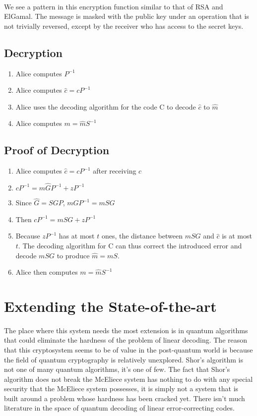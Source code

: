 \documentclass{article}
\theoremstyle{definition}
\begin{document}
	\paragraph{} We see a pattern in this encryption function similar to that of RSA and ElGamal.  The message is masked with the public key under an operation that is not trivially reversed, except by the receiver who has access to the secret keys.
	
	\subsection{Decryption}
	\begin{enumerate}[1)]
	\item Alice computes $P^{-1}$
	\item Alice computes ${\hat c} = cP^{-1}$
	\item Alice uses the decoding algorithm for the code C to decode ${\hat c}$ to ${\hat m}$
	\item Alice computes $m = {\hat m}S^{-1}$
	\end{enumerate}

	\subsection{Proof of Decryption}
	\begin{enumerate}
	\item Alice computes ${\hat c} = cP^{-1}$ after receiving $c$
	\item $cP^{-1} = m{\hat G}P^{-1} + zP^{-1}$
	\item Since ${\hat G} = SGP$, $m{\hat G}P^{-1} = mSG$
	\item Then $cP^{-1} = mSG + zP^{-1}$ 
	\item Because $zP^{-1}$ has at most $t$ ones, the distance between $mSG$ and ${\hat c}$ is at most $t$.  The decoding algorithm for C can thus correct the introduced error and decode $mSG$ to produce ${\hat m} = mS$.
	\item Alice then computes $m = {\hat m}S^{-1}$
	\end{enumerate}
\section{Extending the State-of-the-art}
	\paragraph{} The place where this system needs the most extension is in quantum algorithms that could eliminate the hardness of the problem of linear decoding.  The reason that this cryptosystem seems to be of value in the post-quantum world is because the field of quantum cryptography is relatively unexplored.  Shor's algorithm is not one of many quantum algorithms, it's one of few.  The fact that Shor's algorithm does not break the McEliece system has nothing to do with any special security that the McEliece system possesses, it is simply not a system that is built around a problem whose hardness has been cracked yet.  There isn't much literature in the space of quantum decoding of linear error-correcting codes.
\end{document}

